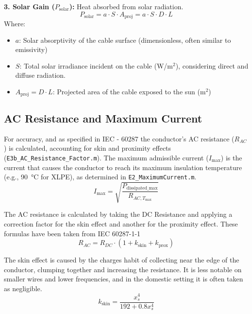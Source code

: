 \documentclass[12pt, a4paper]{article}
\begin{document}
\textbf{3. Solar Gain ($P_{\text{solar}}$):} Heat absorbed from solar radiation.
\begin{equation}
P_{\text{solar}} = a \cdot S \cdot A_{\text{proj}} = a \cdot S \cdot D \cdot L
\end{equation}
Where:
\begin{itemize}
    \item $a$: Solar absorptivity of the cable surface (dimensionless, often similar to emissivity)
    \item $S$: Total solar irradiance incident on the cable (W/m$^2$), considering direct and diffuse radiation.
    \item $A_{\text{proj}} = D \cdot L$: Projected area of the cable exposed to the sun (m$^2$)
\end{itemize}
    
\subsection{AC Resistance and Maximum Current}
For accuracy, and as specified in IEC - 60287 the conductor's AC resistance ($R_{AC}$) is calculated, accounting for skin and proximity effects (\texttt{E3b\_AC\_Resistance\_Factor.m}). The maximum admissible current ($I_{\text{max}}$) is the current that causes the conductor to reach its maximum insulation temperature (e.g., \SI{90}{\celsius} for XLPE), as determined in \texttt{E2\_MaximumCurrent.m}.
\begin{equation}
    I_{\text{max}} = \sqrt{\frac{P_{\text{dissipated\_max}}}{R_{AC, T_{\text{max}}}}}
\end{equation}
    
    The AC resistance is calculated by taking the DC Resistance and applying a correction factor for the skin effect and another for the proximity effect. These formulas have been taken from  IEC 60287-1-1
    \begin{equation}
R_{AC} = R_{DC} \cdot (1 + k_{\text{skin}} + k_{\text{prox}})
\end{equation}

	The skin effect is caused by the charges habit of collecting near the edge of the conductor, clumping together and increasing the resistance. It is less notable on smaller wires and lower frequencies, and in the domestic setting it is often taken as negligible.
\begin{equation}
k_{\text{skin}} = \frac{x_s^4}{192 + 0.8 x_s^4}
\end{equation}
\end{document}
